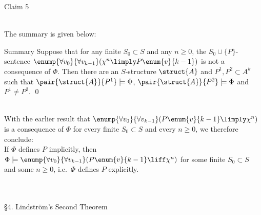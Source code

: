 \begin{enumerate}[1.]
\begin{theorem}{Claim 5}
\end{theorem}\bigskip\\
The summary is given below:\medskip\\
\begin{theorem}{Summary}
Suppose that for any finite $S_0 \subset S$ and any $n \geq 0$, the $S_0 \cup \{ P \}$-sentence $\enump{\forall v_0}{\forall v_{k - 1}} (\chi^n \limply P\enum{v}{k - 1})$ is not a consequence of $\Phi$. Then there are an $S$-structure $\struct{A}$ and $P^1, P^2 \subset A^k$ such that $\pair{\struct{A}}{P^1} \models \Phi$, $\pair{\struct{A}}{P^2} \models \Phi$ and $P^1 \neq P^2$. \qed
\end{theorem}\bigskip\\
With the earlier result that $\enump{\forall v_0}{\forall v_{k - 1}} (P\enum{v}{k - 1} \limply \chi^n)$ is a consequence of $\Phi$ for every finite $S_0 \subset S$ and every $n \geq 0$, we therefore conclude:\medskip\\
If $\Phi$ defines $P$ implicitly, then $\Phi \models \enump{\forall v_0}{\forall v_{k - 1}} (P\enum{v}{k - 1} \liff \chi^n)$ for some finite $S_0 \subset S$ and some $n \geq 0$, i.e.\ $\Phi$ defines $P$ explicitly.
%
\end{enumerate}
\
\\
\\
{\large \S4. Lindstr\"{o}m's Second Theorem}
